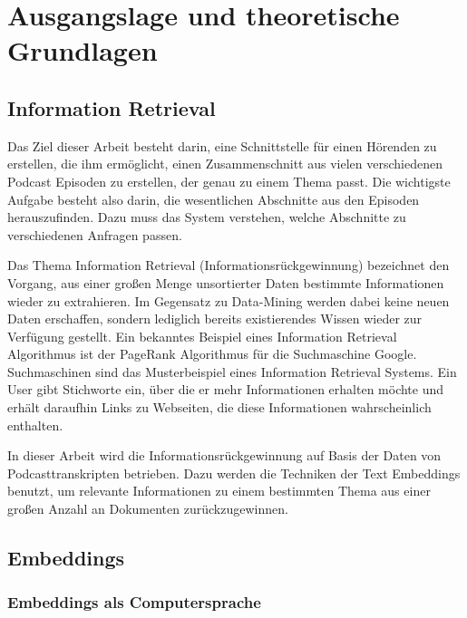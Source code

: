 \chapter{Ausgangslage und theoretische Grundlagen}\label{ch:theoretical}


\section{Information Retrieval}

Das Ziel dieser Arbeit besteht darin, eine Schnittstelle für einen Hörenden zu erstellen, die ihm ermöglicht, einen Zusammenschnitt aus vielen verschiedenen Podcast Episoden zu erstellen, der genau zu einem Thema passt. 
Die wichtigste Aufgabe besteht also darin, die wesentlichen Abschnitte aus den Episoden herauszufinden. 
Dazu muss das System verstehen, welche Abschnitte zu verschiedenen Anfragen passen. 

Das Thema Information Retrieval (Informationsrückgewinnung) bezeichnet den Vorgang, aus einer großen Menge unsortierter Daten bestimmte Informationen wieder zu extrahieren.
Im Gegensatz zu Data-Mining werden dabei keine neuen Daten erschaffen, sondern lediglich bereits existierendes Wissen wieder zur Verfügung gestellt.
Ein bekanntes Beispiel eines Information Retrieval Algorithmus ist der PageRank Algorithmus für die Suchmaschine Google.
Suchmaschinen sind das Musterbeispiel eines Information Retrieval Systems.
Ein User gibt Stichworte ein, über die er mehr Informationen erhalten möchte und erhält daraufhin Links zu Webseiten, die diese Informationen wahrscheinlich enthalten.

In dieser Arbeit wird die Informationsrückgewinnung auf Basis der Daten von Podcasttranskripten betrieben.
Dazu werden die Techniken der Text Embeddings benutzt, um relevante Informationen zu einem bestimmten Thema aus einer großen Anzahl an Dokumenten zurückzugewinnen.



\section{Embeddings}

\subsection{Embeddings als Computersprache}


